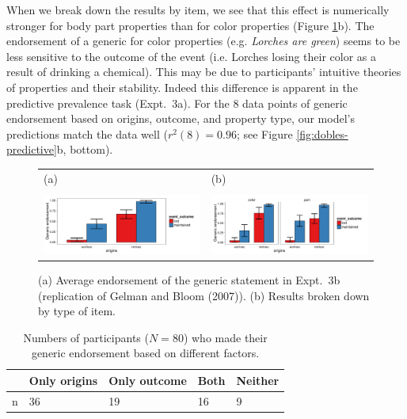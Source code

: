 \documentclass[12pt,letterpaper]{article}
\begin{document}
 
When we break down the results by item, we see that this effect is numerically stronger for body part properties than for color properties (Figure \ref{fig:dobles-results}b).
The endorsement of a generic for color properties (e.g. \emph{Lorches are green}) seems to be less sensitive to the outcome of the event (i.e. Lorches losing their color as a result of drinking a chemical).
This may be due to participants' intuitive theories of properties and their stability. 
Indeed this difference is apparent in the predictive prevalence task (Expt.~3a).
For the 8 data points of generic endorsement based on origins, outcome, and property type, our model's predictions match the data well ($r^2(8) = 0.96$; see Figure \ref{fig:dobles-predictive}b, bottom).


\begin{figure}
\begin{tabular}{l l}
(a) & (b) \\
\\
\centering
    \includegraphics[width=0.5\columnwidth]{dobles-results.pdf} &
    \includegraphics[width=0.5\columnwidth]{dobles-byItem-results.pdf} \\
\end{tabular}
    \caption{
    (a) Average endorsement of the generic statement in Expt.~3b (replication of Gelman and Bloom (2007)). (b)  Results broken down by type of item.
  }
  \label{fig:dobles-results}
\end{figure}


\begin{table}[]
\centering
\begin{tabular}{@{}lllll@{}}
\toprule
  & Only origins & Only outcome & Both & Neither \\ \midrule
n & 36           & 19           & 16   & 9       \\ \bottomrule
\end{tabular}
\caption{Numbers of participants ($N=80$) who made their generic endorsement based on different factors.}
\label{tab:dobles}
\end{table}
\end{document}
